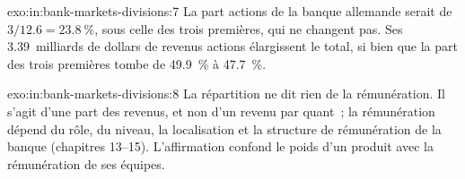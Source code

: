 \begin{solution}{exo:in:bank-markets-divisions:7}
La part actions de la banque allemande serait de $3/12.6=23.8~\%$, sous celle des trois premières, qui ne changent pas. Ses 3.39~milliards de dollars
de revenus actions élargissent le total, si bien que la part des trois premières tombe de 49.9~\% à 47.7~\%.
\end{solution}

\begin{solution}{exo:in:bank-markets-divisions:8}
La répartition ne dit rien de la rémunération. Il s'agit d'une part des revenus, et non d'un revenu par quant~; la rémunération dépend du rôle, du niveau,
la localisation et la structure de rémunération de la banque (chapitres 13--15). L'affirmation confond le poids d'un produit avec la rémunération de ses équipes.
\end{solution}

